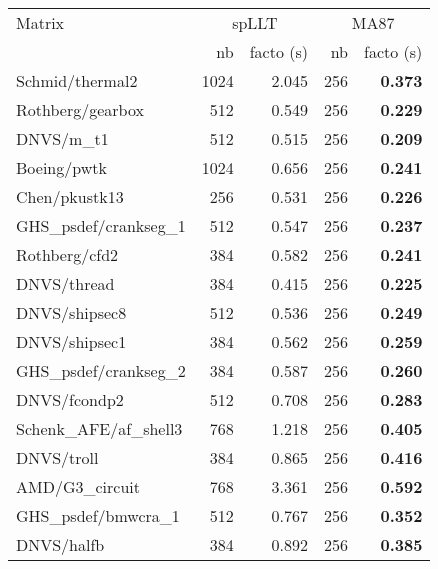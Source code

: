 \begin{tabular}{l|rr|rr}
  \hline
  Matrix                          & \multicolumn{2}{c}{spLLT} & \multicolumn{2}{c}{MA87}     \\
  \cline{2-5}
                                  & nb                        & facto (s) & nb  & facto (s)  \\
  \hline
  Schmid/thermal2                 & 1024                      & 2.045     & 256 & \bf 0.373  \\
  Rothberg/gearbox                & 512                       & 0.549     & 256 & \bf 0.229  \\
  DNVS/m\_t1                      & 512                       & 0.515     & 256 & \bf 0.209  \\
  Boeing/pwtk                     & 1024                      & 0.656     & 256 & \bf 0.241  \\
  Chen/pkustk13                   & 256                       & 0.531     & 256 & \bf 0.226  \\
  GHS\_psdef/crankseg\_1          & 512                       & 0.547     & 256 & \bf 0.237  \\
  Rothberg/cfd2                   & 384                       & 0.582     & 256 & \bf 0.241  \\
  DNVS/thread                     & 384                       & 0.415     & 256 & \bf 0.225  \\
  DNVS/shipsec8                   & 512                       & 0.536     & 256 & \bf 0.249  \\
  DNVS/shipsec1                   & 384                       & 0.562     & 256 & \bf 0.259  \\
  GHS\_psdef/crankseg\_2          & 384                       & 0.587     & 256 & \bf 0.260  \\
  DNVS/fcondp2                    & 512                       & 0.708     & 256 & \bf 0.283  \\
  Schenk\_AFE/af\_shell3          & 768                       & 1.218     & 256 & \bf 0.405  \\
  DNVS/troll                      & 384                       & 0.865     & 256 & \bf 0.416  \\
  AMD/G3\_circuit                 & 768                       & 3.361     & 256 & \bf 0.592  \\
  GHS\_psdef/bmwcra\_1            & 512                       & 0.767     & 256 & \bf 0.352  \\
  DNVS/halfb                      & 384                       & 0.892     & 256 & \bf 0.385  \\

\end{tabular}
